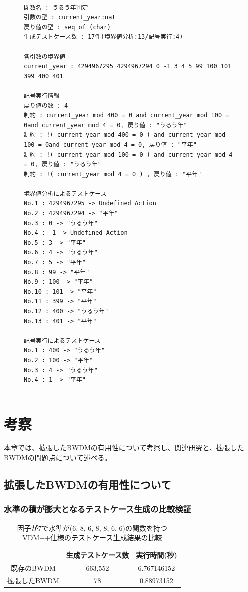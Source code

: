 \documentclass[uplatex, report, a4j, 10pt]{jsbook}
\begin{document}
\lstset{language=}
\begin{figure}[tp]
  \begin{lstlisting}[caption=拡張したBWDMに操作定義を含む仕様(コード\ref{fig:multiple_definition})を適用した際の出力,label=fig:extended_multiple_definition]

関数名 : うるう年判定
引数の型 : current_year:nat 
戻り値の型 : seq of (char)
生成テストケース数 : 17件(境界値分析:13/記号実行:4)

各引数の境界値
current_year : 4294967295 4294967294 0 -1 3 4 5 99 100 101 399 400 401 

記号実行情報
戻り値の数 : 4
制約 : current_year mod 400 = 0 and current_year mod 100 = 0and current_year mod 4 = 0, 戻り値 : "うるう年"
制約 : !( current_year mod 400 = 0 ) and current_year mod 100 = 0and current_year mod 4 = 0, 戻り値 : "平年"
制約 : !( current_year mod 100 = 0 ) and current_year mod 4 = 0, 戻り値 : "うるう年"
制約 : !( current_year mod 4 = 0 ) , 戻り値 : "平年"

境界値分析によるテストケース
No.1 : 4294967295 -> Undefined Action
No.2 : 4294967294 -> "平年"
No.3 : 0 -> "うるう年"
No.4 : -1 -> Undefined Action
No.5 : 3 -> "平年"
No.6 : 4 -> "うるう年"
No.7 : 5 -> "平年"
No.8 : 99 -> "平年"
No.9 : 100 -> "平年"
No.10 : 101 -> "平年"
No.11 : 399 -> "平年"
No.12 : 400 -> "うるう年"
No.13 : 401 -> "平年"

記号実行によるテストケース
No.1 : 400 -> "うるう年"
No.2 : 100 -> "平年"
No.3 : 4 -> "うるう年"
No.4 : 1 -> "平年"
    
\end{lstlisting}
\end{figure}

\chapter{考察}\label{cha:Evaluation}
本章では、拡張したBWDMの有用性について考察し、関連研究と、拡張したBWDMの問題点について述べる。

\section{拡張したBWDMの有用性について}
\subsection{水準の積が膨大となるテストケース生成の比較検証}

\begin{table}[tp]
  \begin{center}
    \caption{因子が7で水準が(6, 8, 6, 8, 8, 6, 6)の関数を持つVDM++仕様のテストケース生成結果の比較}
    \label{tab:pict4java_result}
    \begin{tabular}{c|c|c}
                   & 生成テストケース数 & 実行時間(秒) \\
      \hline
      \hline
      既存のBWDM   & 663,552            & 6.767146152  \\ \hline
      拡張したBWDM & 78                 & 0.88973152
    \end{tabular}
  \end{center}
\end{table}
\end{document}
